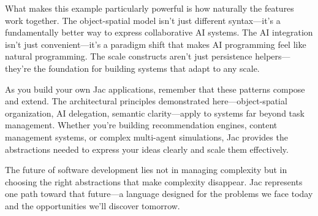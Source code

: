 What makes this example particularly powerful is how naturally the features work together. The object-spatial model isn't just different syntax—it's a fundamentally better way to express collaborative AI systems. The AI integration isn't just convenient—it's a paradigm shift that makes AI programming feel like natural programming. The scale constructs aren't just persistence helpers—they're the foundation for building systems that adapt to any scale.

As you build your own Jac applications, remember that these patterns compose and extend. The architectural principles demonstrated here—object-spatial organization, AI delegation, semantic clarity—apply to systems far beyond task management. Whether you're building recommendation engines, content management systems, or complex multi-agent simulations, Jac provides the abstractions needed to express your ideas clearly and scale them effectively.

The future of software development lies not in managing complexity but in choosing the right abstractions that make complexity disappear. Jac represents one path toward that future—a language designed for the problems we face today and the opportunities we'll discover tomorrow.